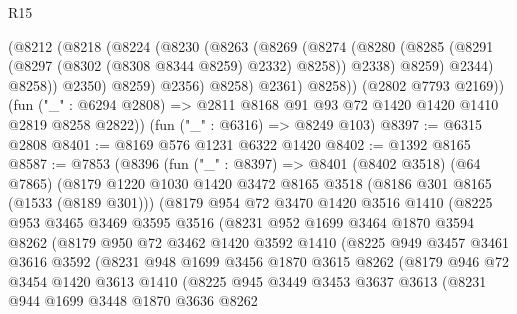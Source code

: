 \begin{lexlean}{R15}
\begin{coremodule}
              (@8212
                (@8218
                  (@8224
                    (@8230
                      (@8263
                        (@8269
                          (@8274
                            (@8280
                              (@8285 (@8291 (@8297 (@8302 (@8308 @8344 @8259) @2332) @8258)) @2338)
                              @8259)
                            @2344)
                          @8258))
                      @2350)
                    @8259)
                  @2356)
                @8258)
              @2361)
            @8258))
        (@2802 @7793 @2169))
      (fun ("_" : @6294 @2808) => @2811 @8168 @91 @93 @72 @1420 @1420 @1410 @2819 @8258 @2822))
    (fun ("_" : @6316) => @8249 @103)
@8397 := @6315 @2808
@8401 := @8169 @576 @1231 @6322 @1420
@8402 := @1392 @8165
@8587 := @7853
    (@8396
      (fun ("_" : @8397) =>
      @8401
        (@8402 @3518)
        (@64 @7865)
        (@8179
          @1220
          @1030
          @1420
          @3472
          @8165
          @3518
          (@8186 @301 @8165 (@1533 (@8189 @301)))
          (@8179
            @954
            @72
            @3470
            @1420
            @3516
            @1410
            (@8225
              @953
              @3465
              @3469
              @3595
              @3516
              (@8231
                @952
                @1699
                @3464
                @1870
                @3594
                @8262
                (@8179
                  @950
                  @72
                  @3462
                  @1420
                  @3592
                  @1410
                  (@8225
                    @949
                    @3457
                    @3461
                    @3616
                    @3592
                    (@8231
                      @948
                      @1699
                      @3456
                      @1870
                      @3615
                      @8262
                      (@8179
                        @946
                        @72
                        @3454
                        @1420
                        @3613
                        @1410
                        (@8225
                          @945
                          @3449
                          @3453
                          @3637
                          @3613
                          (@8231
                            @944
                            @1699
                            @3448
                            @1870
                            @3636
                            @8262

\end{coremodule}
\end{lexlean}
